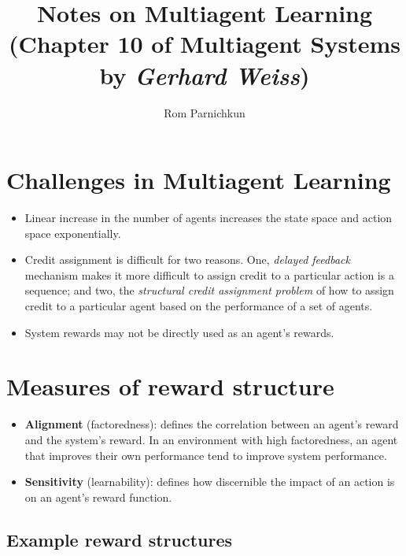 \documentclass[twocolumn]{article}
\theoremstyle{plain}
\begin{document}
\title{Notes on \textbf{Multiagent Learning}\\\small{(Chapter 10 of Multiagent Systems by \textit{Gerhard Weiss})}}
\author{Rom Parnichkun}

\maketitle

\section{Challenges in Multiagent Learning}

\begin{itemize}
    \item Linear increase in the number of agents increases the state space and action space exponentially.
    \item Credit assignment is difficult for two reasons. One, \textit{delayed feedback} mechanism makes it more difficult to assign credit to a particular action is a sequence; and two, the \textit{structural credit assignment problem} of how to assign credit to a particular agent based on the performance of a set of agents.
    \item System rewards may not be directly used as an agent's rewards.
\end{itemize}

\section{Measures of reward structure}

\begin{itemize}
    \item \textbf{Alignment} (factoredness): defines the correlation between an agent's reward and the system's reward. In an environment with high factoredness, an agent that improves their own performance tend to improve system performance.
    \item \textbf{Sensitivity} (learnability): defines how discernible the impact of an action is on an agent's reward function.
\end{itemize}

\subsection{Example reward structures}
\end{document}
